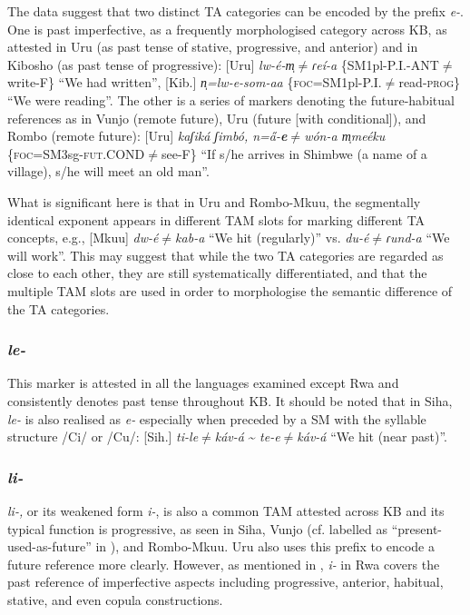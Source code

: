\documentclass[output=paper]{langscibook}
\begin{document}
The data suggest that two distinct TA categories can be encoded by the prefix \textit{e-}. One is past imperfective, as a frequently morphologised category across KB, as attested in Uru (as past tense of stative, progressive, and anterior) and in Kibosho (as past tense of progressive): [Uru] \textit{lw-é-m̩${\neq}$ɾeí-a} \{SM1pl-P.I.-ANT${\neq}$write-F\} “We had written”, [Kib.] \textit{n̩=lw-e{}-som-aa} \{\textsc{foc}=SM1pl-P.I.${\neq}$read-\textsc{prog}\} “We were reading”. The other is a series of markers denoting the future-habitual references as in Vunjo (remote future), Uru (future [with conditional]), and Rombo (remote future): [Uru] \textit{kaʃiká ʃimbó, n=\H{a}-}\textbf{\textit{e}}\textit{${\neq}$wón-a m̩meéku} \{\textsc{foc}=SM3sg-\textsc{fut}.COND${\neq}$see-F\} {“If s/he arrives in Shimbwe (a name of a village), s/he will meet an old man”.}

  What is significant here is that in Uru and Rombo-Mkuu, the segmentally identical exponent appears in different TAM slots for marking different TA concepts, e.g., [Mkuu] \textit{dw-é${\neq}$kab-a} “We hit (regularly)” vs. \textit{du-é${\neq}$ɾund-a} “We will work”. This may suggest that while the two TA categories are regarded as close to each other, they are still systematically differentiated, and that the multiple TAM slots are used in order to morphologise the semantic difference of the TA categories.

\subsubsection{\textit{le-}}\label{sec:shinagawa:3.1.3}

  This marker is attested in all the languages examined except Rwa and consistently denotes past tense throughout KB. It should be noted that in Siha, \textit{le-} is also realised as \textit{e-} especially when preceded by a SM with the syllable structure /Ci/ or /Cu/: [Sih.] \textit{ti-le${\neq}$káv-á} {\textasciitilde} \textit{te-e${\neq}$káv-á} “We hit (near past)”.

\subsubsection{\textit{li-}}\label{sec:shinagawa:3.1.4}

  \textit{li-,} or its weakened form \textit{i-}, is also a common TAM attested across KB and its typical function is progressive, as seen in Siha, Vunjo (cf. labelled as “present-used-as-future” in \citealt{Nurse2003a}), and Rombo-Mkuu. Uru also uses this prefix to encode a future reference more clearly. However, as mentioned in , \textit{i-} in Rwa covers the past reference of imperfective aspects including progressive, anterior, habitual, stative, and even copula constructions.
\end{document}
